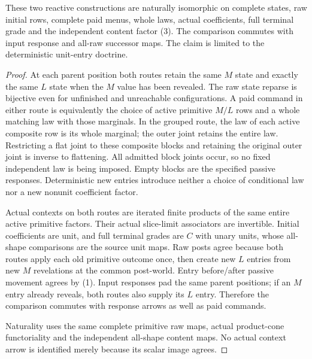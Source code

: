 \documentclass[11pt]{article}\usepackage{amsmath,amssymb,amsthm,geometry}\geometry{margin=1in}
\begin{document}
\begin{theorem}
These two reactive constructions are naturally isomorphic on complete states, raw initial rows, complete paid menus, whole laws, actual coefficients, full terminal grade and the independent content factor (3). The comparison commutes with input response and all-raw successor maps. The claim is limited to the deterministic unit-entry doctrine.
\end{theorem}
\begin{proof}
At each parent position both routes retain the same $M$ state and exactly the same $L$ state when the $M$ value has been revealed. The raw state reparse is bijective even for unfinished and unreachable configurations. A paid command in either route is equivalently the choice of active primitive $M/L$ rows and a whole matching law with those marginals. In the grouped route, the law of each active composite row is its whole marginal; the outer joint retains the entire law. Restricting a flat joint to these composite blocks and retaining the original outer joint is inverse to flattening. All admitted block joints occur, so no fixed independent law is being imposed. Empty blocks are the specified passive responses. Deterministic new entries introduce neither a choice of conditional law nor a new nonunit coefficient factor.

Actual contexts on both routes are iterated finite products of the same entire active primitive factors. Their actual slice-limit associators are invertible. Initial coefficients are unit, and full terminal grades are $C$ with unary units, whose all-shape comparisons are the source unit maps. Raw posts agree because both routes apply each old primitive outcome once, then create new $L$ entries from new $M$ revelations at the common post-world. Entry before/after passive movement agrees by (1). Input responses pad the same parent positions; if an $M$ entry already reveals, both routes also supply its $L$ entry. Therefore the comparison commutes with response arrows as well as paid commands.

Naturality uses the same complete primitive raw maps, actual product-cone functoriality and the independent all-shape content maps. No actual context arrow is identified merely because its scalar image agrees.\end{proof}
\end{document}
